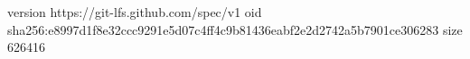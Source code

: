 version https://git-lfs.github.com/spec/v1
oid sha256:e8997d1f8e32ccc9291e5d07c4ff4c9b81436eabf2e2d2742a5b7901ce306283
size 626416
